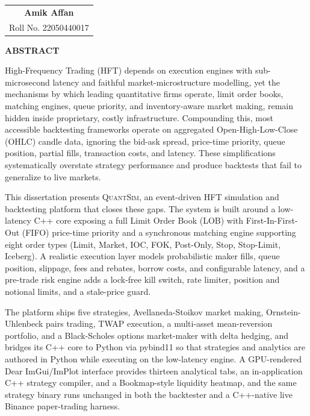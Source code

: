 \documentclass[12pt,oneside,a4paper]{report}
\newcommand{\quantsim}{\textsc{QuantSim}}
\begin{document}
\vspace{0.8in}

\begin{flushright}
\begin{tabular}{c}
\textbf{Amik Affan} \\
Roll No. 22050440017
\end{tabular}
\end{flushright}

\clearpage
\begin{center}
{\Large\bfseries ABSTRACT}
\end{center}
\vspace{0.2in}

High-Frequency Trading (HFT) depends on execution engines with sub-microsecond latency and faithful market-microstructure modelling, yet the mechanisms by which leading quantitative firms operate, limit order books, matching engines, queue priority, and inventory-aware market making, remain hidden inside proprietary, costly infrastructure. Compounding this, most accessible backtesting frameworks operate on aggregated Open-High-Low-Close (OHLC) candle data, ignoring the bid-ask spread, price-time priority, queue position, partial fills, transaction costs, and latency. These simplifications systematically overstate strategy performance and produce backtests that fail to generalize to live markets.

This dissertation presents \quantsim{}, an event-driven HFT simulation and backtesting platform that closes these gaps. The system is built around a low-latency C++ core exposing a full Limit Order Book (LOB) with First-In-First-Out (FIFO) price-time priority and a synchronous matching engine supporting eight order types (Limit, Market, IOC, FOK, Post-Only, Stop, Stop-Limit, Iceberg). A realistic execution layer models probabilistic maker fills, queue position, slippage, fees and rebates, borrow costs, and configurable latency, and a pre-trade risk engine adds a lock-free kill switch, rate limiter, position and notional limits, and a stale-price guard.

The platform ships five strategies, Avellaneda-Stoikov market making, Ornstein-Uhlenbeck pairs trading, TWAP execution, a multi-asset mean-reversion portfolio, and a Black-Scholes options market-maker with delta hedging, and bridges its C++ core to Python via pybind11 so that strategies and analytics are authored in Python while executing on the low-latency engine. A GPU-rendered Dear ImGui/ImPlot interface provides thirteen analytical tabs, an in-application C++ strategy compiler, and a Bookmap-style liquidity heatmap, and the same strategy binary runs unchanged in both the backtester and a C++-native live Binance paper-trading harness.
\end{document}
